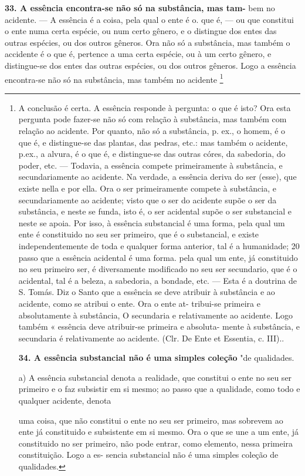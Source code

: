 \documentclass[12pt,a4paper]{article}
\newcommand{\pagmark}[1]{\quad[\textit{p.\,#1}]\quad}
\begin{document}
{{{\medskip\noindent\textbf{33. A essência encontra-se não só na substância, mas tam-}
bem no acidente. — A essência é a coisa, pela qual o ente é
o. que é, — ou que constitui o ente numa certa espécie, ou num
certo gênero, e o distingue dos entes das outras espécies, ou
dos outros gêneros. Ora não só a substância, mas também o accidente é o que é, pertence a uma certa espécie, ou à um certo
gênero, e distingue-se dos entes das outras espécies, ou dos
outros gêneros. Logo a essência encontra-se não só na substância,
mas também no acidente \footnote{A conclusão é certa. A essência responde à pergunta: o que é isto?
Ora esta pergunta pode fazer-se não só com relação à substância, mas também com relação ao acidente. Por quanto, não só a substância,
 p. ex., o homem, é o que é, e distingue-se das plantas, das pedras, etc.: mas também
o acidente, p.ex., a alvura, é o que é, e distingue-se das outras córes, da
sabedoria, do poder, etc. — Todavia, a essência compete primeiramente à
substância, e secundariamente ao acidente. Na verdade, a essência deriva do
ser (esse), que existe nella e por ella. Ora o ser primeiramente compete à
substância, e secundariamente ao acidente; visto que o ser do acidente
supõe o ser da substância, e neste se funda, isto é, o ser acidental supõe
o ser substancial e neste se apoia. Por isso, à essência substancial é uma
forma, pela qual um ente é constituido no seu ser primeiro, que é o substancial,
e existe independentemente de toda e qualquer forma anterior, tal é a humanidade; 20 passo que a essência acidental é uma forma. pela qual um
\pagmark{306}
 ente, já constituido no seu primeiro ser, é diversamente modificado no seu
 ser secundario, que é o acidental, tal é a beleza, a sabedoria, a bondade, etc.
 — Esta é a doutrina de S. Tomás. Diz o Santo que a essência se deve
 atribuir à substância e ao acidente, como se atribui o ente. Ora o ente at-
 tribui-se primeira e absolutamente à substância, O secundaria e relativamente
 ao acidente. Logo também « essência deve atribuir-se primeira e absoluta-
 mente à substância, e secundaria é relativamente ao acidente. (Clr. De Ente
 et Essentia, c. III).. 
\pagmark{306}

\medskip\noindent\textbf{34. A essência substancial não é uma simples coleção}
"de qualidades.

     \medskip\noindent a) A essência substancial denota a realidade, que constitui
 o ente no seu ser primeiro e o faz subsistir em si mesmo; ao
 passo que a qualidade, como todo e qualquer acidente, denota

 uma coisa, que não constitui o ente no seu ser primeiro, mas
 sobrevem ao ente  já constituido e subsistente em si mesmo. Ora
 o que se une a um ente, já constituido no ser primeiro, não pode
 entrar, como elemento, nessa primeira constituição. Logo a es-
 sencia substancial não é uma simples coleção de qualidades.

}}}}
\end{document}
